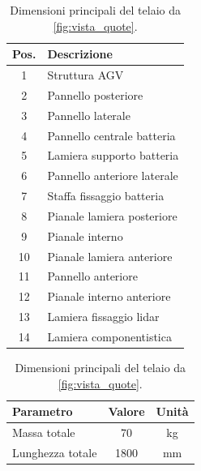 \begin{table}[htbp]
    \centering
    \begin{minipage}[t]{0.48\textwidth}
        \centering
        \caption{Distinta componenti principali del telaio per \cref{fig:telaio_esploso}.}
        \label{tab:bom_telaio}
        \begin{tabular}{|c|l|}
            \hline
            \textbf{Pos.} & \textbf{Descrizione}        \\
            \hline
            1             & Struttura AGV               \\
            2             & Pannello posteriore         \\
            3             & Pannello laterale           \\
            4             & Pannello centrale batteria  \\
            5             & Lamiera supporto batteria   \\
            6             & Pannello anteriore laterale \\
            7             & Staffa fissaggio batteria   \\
            8             & Pianale lamiera posteriore  \\
            9             & Pianale interno             \\
            10            & Pianale lamiera anteriore   \\
            11            & Pannello anteriore          \\
            12            & Pianale interno anteriore   \\
            13            & Lamiera fissaggio lidar     \\
            14            & Lamiera componentistica     \\
            \hline
        \end{tabular}
    \end{minipage}
    \hfill
    \begin{minipage}[t]{0.48\textwidth}
        \centering
        \caption{Dimensioni principali del telaio da \cref{fig:vista_quote}.}
        \label{tab:dimensioni_telaio}
        \begin{tabular}{|l|c|c|}
            \hline
            \textbf{Parametro}      & \textbf{Valore} & \textbf{Unità} \\
            \hline
            Massa totale            & 70              & kg             \\
            Lunghezza totale        & 1800            & mm             \\

\end{tabular}
\end{minipage}
\end{table}
